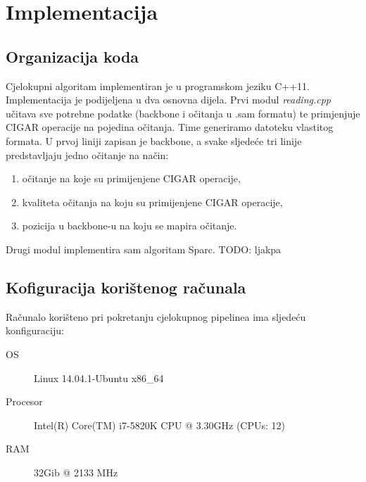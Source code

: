 \chapter{Implementacija}
\label{sec:implementacija}

\section{Organizacija koda}
Cjelokupni algoritam implementiran je u programskom jeziku C++11.
Implementacija je podijeljena u dva osnovna dijela.
Prvi modul \emph{reading.cpp} učitava sve potrebne podatke (backbone i očitanja u .sam formatu) te primjenjuje CIGAR operacije na pojedina očitanja.
Time generiramo datoteku vlastitog formata.
U prvoj liniji zapisan je backbone, a svake sljedeće tri linije predstavljaju jedno očitanje na način:
\begin{enumerate}
  \item očitanje na koje su primijenjene CIGAR operacije,
  \item kvaliteta očitanja na koju su primijenjene CIGAR operacije,
  \item pozicija u backbone-u na koju se mapira očitanje.
\end{enumerate}

Drugi modul implementira sam algoritam Sparc.
TODO: ljakpa

\section{Kofiguracija korištenog računala}

Računalo korišteno pri pokretanju cjelokupnog pipelinea ima sljedeću konfiguraciju:
\begin{description}
  \item [OS] Linux 14.04.1-Ubuntu x86\_64
  \item [Procesor] Intel(R) Core(TM) i7-5820K CPU @ 3.30GHz (CPUs: 12)
  \item [RAM] 32Gib @ 2133 MHz
\end{description}

